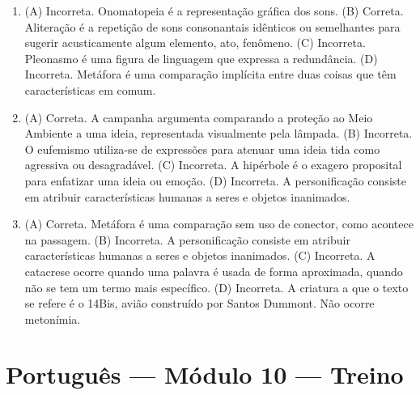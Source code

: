 \begin{enumerate}
\item (A) Incorreta. Onomatopeia é a representação gráfica dos sons.
(B) Correta. Aliteração é a repetição de sons consonantais idênticos ou
semelhantes para sugerir acusticamente algum elemento, ato, fenômeno.
(C) Incorreta. Pleonasmo é uma figura de linguagem que expressa a
redundância.
(D) Incorreta. Metáfora é uma comparação implícita entre duas coisas que
têm características em comum.

\item (A) Correta. A campanha argumenta comparando a proteção ao Meio Ambiente
a uma ideia, representada visualmente pela lâmpada.
(B) Incorreta. O eufemismo utiliza-se de expressões para atenuar uma
ideia tida como agressiva ou desagradável.
(C) Incorreta. A hipérbole é o exagero proposital para enfatizar uma
ideia ou emoção.
(D) Incorreta. A personificação consiste em atribuir características
humanas a seres e objetos inanimados.

\item (A) Correta. Metáfora é uma comparação sem uso de conector, como acontece
na passagem.
(B) Incorreta. A personificação consiste em atribuir características
humanas a seres e objetos inanimados.
(C) Incorreta. A catacrese ocorre quando uma palavra é usada de forma
aproximada, quando não se tem um termo mais específico.
(D) Incorreta. A criatura a que o texto se refere é o 14Bis, avião
construído por Santos Dummont. Não ocorre metonímia.
\end{enumerate}

\section*{Português — Módulo 10 — Treino}

